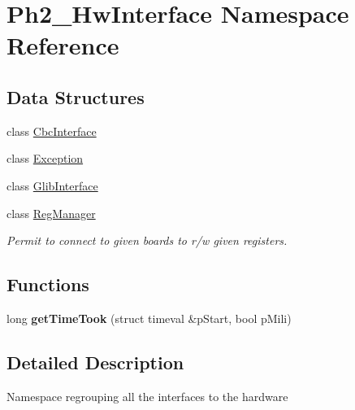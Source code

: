 \hypertarget{namespace_ph2___hw_interface}{\section{Ph2\-\_\-\-Hw\-Interface Namespace Reference}
\label{namespace_ph2___hw_interface}
}
\subsection*{Data Structures}
\begin{DoxyCompactItemize}
\item 
class \hyperlink{class_ph2___hw_interface_1_1_cbc_interface}{Cbc\-Interface}
\item 
class \hyperlink{class_ph2___hw_interface_1_1_exception}{Exception}
\item 
class \hyperlink{class_ph2___hw_interface_1_1_glib_interface}{Glib\-Interface}
\item 
class \hyperlink{class_ph2___hw_interface_1_1_reg_manager}{Reg\-Manager}
\begin{DoxyCompactList}\small\item\em Permit to connect to given boards to r/w given registers. \end{DoxyCompactList}\end{DoxyCompactItemize}
\subsection*{Functions}
\begin{DoxyCompactItemize}
\item 
\hypertarget{namespace_ph2___hw_interface_a033a07cbe28368de19d534ef7cd3325d}{long {\bfseries get\-Time\-Took} (struct timeval \&p\-Start, bool p\-Mili)}\label{namespace_ph2___hw_interface_a033a07cbe28368de19d534ef7cd3325d}

\end{DoxyCompactItemize}


\subsection{Detailed Description}
Namespace regrouping all the interfaces to the hardware 